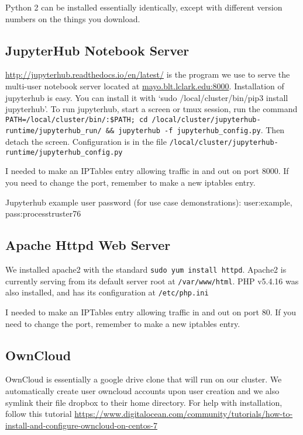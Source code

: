 \documentclass[]{book}
\begin{document}
Python 2 can be installed essentially identically, except with different
version numbers on the things you download.

\subsection{JupyterHub Notebook
Server}\label{jupyterhub-notebook-server}

\href{Jupyterhub}{http://jupyterhub.readthedocs.io/en/latest/} is the
program we use to serve the multi-user notebook server located at
\url{mayo.blt.lclark.edu:8000}. Installation of jupyterhub is easy. You
can install it with `sudo /local/cluster/bin/pip3 install jupyterhub'.
To run jupyterhub, start a screen or tmux session, run the command
\texttt{PATH=/local/cluster/bin/:\$PATH;\ cd\ /local/cluster/jupyterhub-runtime/jupyterhub\_run/\ \&\&\ jupyterhub\ -f\ jupyterhub\_config.py}.
Then detach the screen. Configuration is in the file
\texttt{/local/cluster/jupyterhub-runtime/jupyterhub\_config.py}

I needed to make an IPTables entry allowing traffic in and out on port
8000. If you need to change the port, remember to make a new iptables
entry.

Jupyterhub example user password (for use case demonstrations):
user:example, pass:processtruster76

\subsection{Apache Httpd Web Server}\label{apache-httpd-web-server}

We installed apache2 with the standard
\texttt{sudo\ yum\ install\ httpd}. Apache2 is currently serving from
its default server root at \texttt{/var/www/html}. PHP v5.4.16 was also
installed, and has its configuration at \texttt{/etc/php.ini}

I needed to make an IPTables entry allowing traffic in and out on port
80. If you need to change the port, remember to make a new iptables
entry.

\subsection{OwnCloud}\label{owncloud}

OwnCloud is essentially a google drive clone that will run on our
cluster. We automatically create user owncloud accounts upon user
creation and we also symlink their file dropbox to their home directory.
For help with installation, follow this tutorial
\href{Here}{https://www.digitalocean.com/community/tutorials/how-to-install-and-configure-owncloud-on-centos-7}
\end{document}

